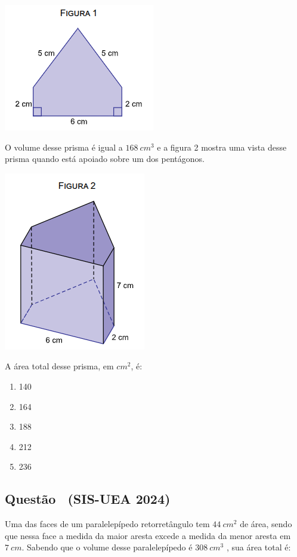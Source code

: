 \documentclass[12pt]{article}
\newcounter{questao}
\newcommand{\novaquestao}[1]{%
  \stepcounter{questao}%
  \subsection*{Questão \thequestao\ (#1)}%
}
\begin{document}
\begin{multicols}{2}
            \begin{center}
                \includegraphics[scale=0.6]{q1-fig1.png}
            \end{center} O volume desse prisma é igual a $168\ cm^{3}$ e a figura 2 mostra uma vista desse prisma quando está apoiado sobre um dos pentágonos.

            \begin{center}
                \includegraphics[scale=0.6]{q1-fig2.png} 
            \end{center} A área total desse prisma, em $cm^{2}$, é:
        
            \begin{enumerate}[label=(\alph*), noitemsep]
                \item 140
                \item 164
                \item {188} %
                \item 212
                \item 236
            \end{enumerate}

        \novaquestao{SIS-UEA 2024}
            Uma das faces de um paralelepípedo retorretângulo tem $44\ cm^{2}$ de área, sendo que nessa face a medida da maior aresta excede a medida da menor aresta em $7\ cm$. Sabendo que o volume desse paralelepípedo é $308\ cm^{3}$ , sua área total é:


\end{multicols}
\end{document}
